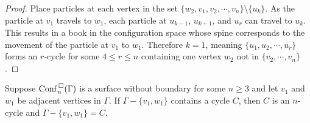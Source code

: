 \begin{proof}
    Place particles at each vertex in the set \(\{w_2, v_1, v_2, \cdots, v_n\}\setminus\{u_k\}\).
    As the particle at \(v_1\) travels to \(w_1\),
    each particle at \(u_{k-1}\), \(u_{k+1}\), and \(u_r\) can travel to \(u_k\).
    This results in a book in the configuration space whose spine corresponds to the movement of the particle at \(v_1\) to \(w_1\).
    Therefore \(k = 1\), meaning \(\{u_1, u_2, \cdots, u_r\}\) forms an \(r\)-cycle for some \(4 \le r \le n\)
    containing one vertex \(w_2\) not in \(\{v_2, \cdots, v_n\}\).
\end{proof}

\begin{lem}
\label{lem:is_surface_C}
Suppose \(\mathrm{Conf}^{\,\square}_n(\Gamma)\) is a surface without boundary for some \(n \ge 3\)
and let \(v_1\) and \(w_1\) be adjacent vertices in \(\Gamma\).
If \(\Gamma - \{v_1, w_1\}\) contains a cycle \(C\), then \(C\) is an \(n\)-cycle and \(\Gamma - \{v_1, w_1\} = C\).
\end{lem}
